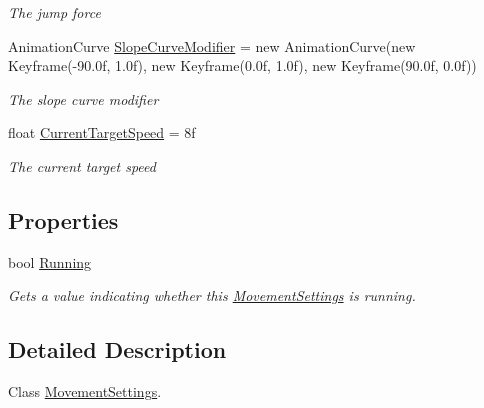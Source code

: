 \begin{DoxyCompactItemize}
\begin{DoxyCompactList}\small\item\em The jump force \end{DoxyCompactList}\item 
Animation\+Curve \hyperlink{class_lerp2_assets_1_1_characters_1_1_first_person_1_1_rigidbody_first_person_controller_1_1_movement_settings_ab7baf4611286ff544b437a7d92058c97}{Slope\+Curve\+Modifier} = new Animation\+Curve(new Keyframe(-\/90.\+0f, 1.\+0f), new Keyframe(0.\+0f, 1.\+0f), new Keyframe(90.\+0f, 0.\+0f))
\begin{DoxyCompactList}\small\item\em The slope curve modifier \end{DoxyCompactList}\item 
float \hyperlink{class_lerp2_assets_1_1_characters_1_1_first_person_1_1_rigidbody_first_person_controller_1_1_movement_settings_a1b6e24512637d06ea47d2fb05f95ecdb}{Current\+Target\+Speed} = 8f
\begin{DoxyCompactList}\small\item\em The current target speed \end{DoxyCompactList}\end{DoxyCompactItemize}
\subsection*{Properties}
\begin{DoxyCompactItemize}
\item 
bool \hyperlink{class_lerp2_assets_1_1_characters_1_1_first_person_1_1_rigidbody_first_person_controller_1_1_movement_settings_a0bf9d6e4a3e43e182fc11dcd49d04089}{Running}
\begin{DoxyCompactList}\small\item\em Gets a value indicating whether this \hyperlink{class_lerp2_assets_1_1_characters_1_1_first_person_1_1_rigidbody_first_person_controller_1_1_movement_settings}{Movement\+Settings} is running. \end{DoxyCompactList}\end{DoxyCompactItemize}


\subsection{Detailed Description}
Class \hyperlink{class_lerp2_assets_1_1_characters_1_1_first_person_1_1_rigidbody_first_person_controller_1_1_movement_settings}{Movement\+Settings}. 



